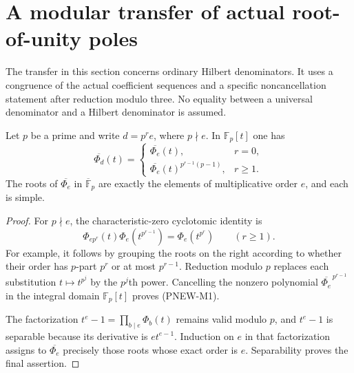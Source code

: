 \section{A modular transfer of actual root-of-unity poles}
\label{sec:modular-pole-transfer}

The transfer in this section concerns ordinary Hilbert denominators.
It uses a congruence of the actual coefficient sequences and a
specific noncancellation statement after reduction modulo three.
No equality between a universal denominator and a Hilbert
denominator is assumed.

\begin{lemma}
Let $p$ be a prime and write $d=p^r e$, where $p\nmid e$.
In $\mathbb F_p[t]$ one has
\[
 \overline{\Phi_d}(t)=
 \begin{cases}
 \overline{\Phi_e}(t),&r=0,\\
 \overline{\Phi_e}(t)^{p^{r-1}(p-1)},&r\ge1.
 \end{cases}
 \tag{PNEW-M1}
\]
The roots of $\overline{\Phi_e}$ in
$\overline{\mathbb F}_p$ are exactly the elements of
multiplicative order $e$, and each is simple.
\end{lemma}
\begin{proof}
For $p\nmid e$, the characteristic-zero cyclotomic identity is
\[
 \Phi_{ep^r}(t)\Phi_e(t^{p^{r-1}})=\Phi_e(t^{p^r})
 \qquad(r\ge1).
\]
For example, it follows by grouping the roots on the right
according to whether their order has $p$-part $p^r$ or at
most $p^{r-1}$. Reduction modulo $p$ replaces each substitution
$t\mapsto t^{p^j}$ by the $p^j$th power. Cancelling the nonzero
polynomial $\overline{\Phi_e}^{\,p^{r-1}}$ in the integral
domain $\mathbb F_p[t]$ proves (PNEW-M1).

The factorization $t^e-1=\prod_{b\mid e}\Phi_b(t)$ remains
valid modulo $p$, and $t^e-1$ is separable because its derivative
is $e t^{e-1}$. Induction on $e$ in that factorization assigns
to $\overline{\Phi_e}$ precisely those roots whose exact
order is $e$. Separability proves the final assertion.
\end{proof}

